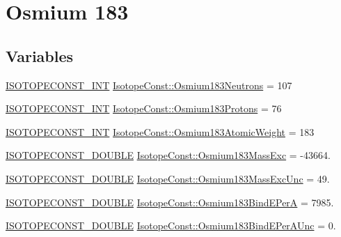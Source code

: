 \hypertarget{group___isotope_const-_osmium-_os183}{}\section{Osmium 183}
\label{group___isotope_const-_osmium-_os183}
\subsection*{Variables}
\begin{DoxyCompactItemize}
\item 
\mbox{\hyperlink{group___isotope_const-_macros_ga5f18360b3e99483a35c32d789e62621c}{I\+S\+O\+T\+O\+P\+E\+C\+O\+N\+S\+T\+\_\+\+I\+NT}} \mbox{\hyperlink{group___isotope_const-_osmium-_os183_gac2c7985f6b9f7f050349fe92d4948ed7}{Isotope\+Const\+::\+Osmium183\+Neutrons}} = 107
\item 
\mbox{\hyperlink{group___isotope_const-_macros_ga5f18360b3e99483a35c32d789e62621c}{I\+S\+O\+T\+O\+P\+E\+C\+O\+N\+S\+T\+\_\+\+I\+NT}} \mbox{\hyperlink{group___isotope_const-_osmium-_os183_ga6c207b1f9ff6889c97556f77bbc2b6f8}{Isotope\+Const\+::\+Osmium183\+Protons}} = 76
\item 
\mbox{\hyperlink{group___isotope_const-_macros_ga5f18360b3e99483a35c32d789e62621c}{I\+S\+O\+T\+O\+P\+E\+C\+O\+N\+S\+T\+\_\+\+I\+NT}} \mbox{\hyperlink{group___isotope_const-_osmium-_os183_ga2e06f0d54ea7c839d66f6bc961fa50b3}{Isotope\+Const\+::\+Osmium183\+Atomic\+Weight}} = 183
\item 
\mbox{\hyperlink{group___isotope_const-_macros_ga8f45a7272ce02c0b4c65c44636ed719a}{I\+S\+O\+T\+O\+P\+E\+C\+O\+N\+S\+T\+\_\+\+D\+O\+U\+B\+LE}} \mbox{\hyperlink{group___isotope_const-_osmium-_os183_ga17c31ffd42c9af0a922003f2f75cdeba}{Isotope\+Const\+::\+Osmium183\+Mass\+Exc}} = -\/43664.
\item 
\mbox{\hyperlink{group___isotope_const-_macros_ga8f45a7272ce02c0b4c65c44636ed719a}{I\+S\+O\+T\+O\+P\+E\+C\+O\+N\+S\+T\+\_\+\+D\+O\+U\+B\+LE}} \mbox{\hyperlink{group___isotope_const-_osmium-_os183_gab15a125577a50e8a6b840b8aee329cf2}{Isotope\+Const\+::\+Osmium183\+Mass\+Exc\+Unc}} = 49.
\item 
\mbox{\hyperlink{group___isotope_const-_macros_ga8f45a7272ce02c0b4c65c44636ed719a}{I\+S\+O\+T\+O\+P\+E\+C\+O\+N\+S\+T\+\_\+\+D\+O\+U\+B\+LE}} \mbox{\hyperlink{group___isotope_const-_osmium-_os183_gae574f6bf77f96f7d864eb8360b79df8c}{Isotope\+Const\+::\+Osmium183\+Bind\+E\+PerA}} = 7985.
\item 
\mbox{\hyperlink{group___isotope_const-_macros_ga8f45a7272ce02c0b4c65c44636ed719a}{I\+S\+O\+T\+O\+P\+E\+C\+O\+N\+S\+T\+\_\+\+D\+O\+U\+B\+LE}} \mbox{\hyperlink{group___isotope_const-_osmium-_os183_ga9fe933a09b746599b5e0532041d54391}{Isotope\+Const\+::\+Osmium183\+Bind\+E\+Per\+A\+Unc}} = 0.

\end{DoxyCompactItemize}
